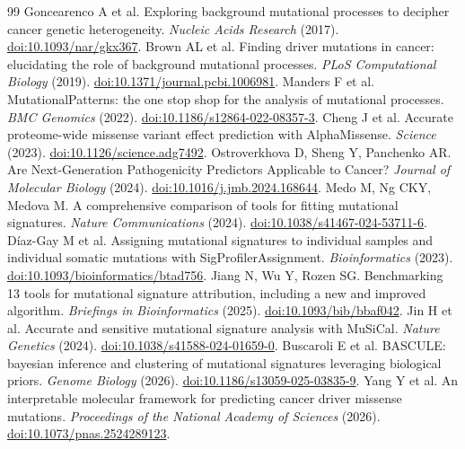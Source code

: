 \documentclass[11pt]{article}
\begin{document}
{\small
\begin{thebibliography}{99}
\setlength{\itemsep}{2pt}
 Goncearenco A et al. Exploring background mutational processes to decipher cancer genetic heterogeneity. \emph{Nucleic Acids Research} (2017). \href{https://doi.org/10.1093/nar/gkx367}{doi:10.1093/nar/gkx367}.
 Brown AL et al. Finding driver mutations in cancer: elucidating the role of background mutational processes. \emph{PLoS Computational Biology} (2019). \href{https://doi.org/10.1371/journal.pcbi.1006981}{doi:10.1371/journal.pcbi.1006981}.
 Manders F et al. MutationalPatterns: the one stop shop for the analysis of mutational processes. \emph{BMC Genomics} (2022). \href{https://doi.org/10.1186/s12864-022-08357-3}{doi:10.1186/s12864-022-08357-3}.
 Cheng J et al. Accurate proteome-wide missense variant effect prediction with AlphaMissense. \emph{Science} (2023). \href{https://doi.org/10.1126/science.adg7492}{doi:10.1126/science.adg7492}.
 Ostroverkhova D, Sheng Y, Panchenko AR. Are Next-Generation Pathogenicity Predictors Applicable to Cancer? \emph{Journal of Molecular Biology} (2024). \href{https://doi.org/10.1016/j.jmb.2024.168644}{doi:10.1016/j.jmb.2024.168644}.
 Medo M, Ng CKY, Medova M. A comprehensive comparison of tools for fitting mutational signatures. \emph{Nature Communications} (2024). \href{https://doi.org/10.1038/s41467-024-53711-6}{doi:10.1038/s41467-024-53711-6}.
 D\'{i}az-Gay M et al. Assigning mutational signatures to individual samples and individual somatic mutations with SigProfilerAssignment. \emph{Bioinformatics} (2023). \href{https://doi.org/10.1093/bioinformatics/btad756}{doi:10.1093/bioinformatics/btad756}.
 Jiang N, Wu Y, Rozen SG. Benchmarking 13 tools for mutational signature attribution, including a new and improved algorithm. \emph{Briefings in Bioinformatics} (2025). \href{https://doi.org/10.1093/bib/bbaf042}{doi:10.1093/bib/bbaf042}.
 Jin H et al. Accurate and sensitive mutational signature analysis with MuSiCal. \emph{Nature Genetics} (2024). \href{https://doi.org/10.1038/s41588-024-01659-0}{doi:10.1038/s41588-024-01659-0}.
 Buscaroli E et al. BASCULE: bayesian inference and clustering of mutational signatures leveraging biological priors. \emph{Genome Biology} (2026). \href{https://doi.org/10.1186/s13059-025-03835-9}{doi:10.1186/s13059-025-03835-9}.
 Yang Y et al. An interpretable molecular framework for predicting cancer driver missense mutations. \emph{Proceedings of the National Academy of Sciences} (2026). \href{https://doi.org/10.1073/pnas.2524289123}{doi:10.1073/pnas.2524289123}.
\end{thebibliography}
}
\end{document}
